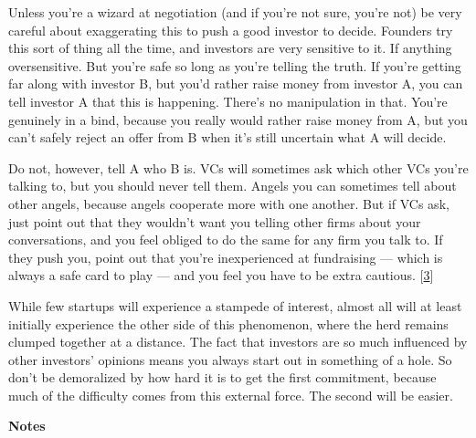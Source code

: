 Unless you're a wizard at negotiation (and
                    if you're not sure, you're not) be very careful about
                    exaggerating this to push a good investor to decide.
                    Founders try this sort of thing all the time, and investors
                    are very sensitive to it. If anything oversensitive. But
                    you're safe so long as you're telling the truth. If you're
                    getting far along with investor B, but you'd rather raise
                    money from investor A, you can tell investor A that this is
                    happening. There's no manipulation in that. You're genuinely
                    in a bind, because you really would rather raise money from
                    A, but you can't safely reject an offer from B when it's
                    still uncertain what A will decide.

Do not,
                    however, tell A who B is. VCs will sometimes ask which other
                    VCs you're talking to, but you should never tell them.
                    Angels you can sometimes tell about other angels, because
                    angels cooperate more with one another. But if VCs ask, just
                    point out that they wouldn't want you telling other firms
                    about your conversations, and you feel obliged to do the
                    same for any firm you talk to. If they push you, point out
                    that you're inexperienced at fundraising --- which is
                    always a safe card to play --- and you feel you have to
                    be extra cautious.
                    [\href{\#f3n}{3}]

While few startups will experience a stampede
                    of interest, almost all will at least initially experience
                    the other side of this phenomenon, where the herd remains
                    clumped together at a distance. The fact that investors are
                    so much influenced by other investors' opinions means you
                    always start out in something of a hole. So don't be
                    demoralized by how hard it is to get the first commitment,
                    because much of the difficulty comes from this external
                    force. The second will be easier.







\textbf{Notes}


